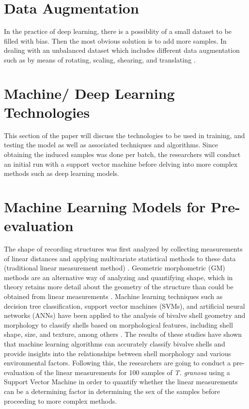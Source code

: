 \section{Data Augmentation}
In the practice of deep learning, there is a possiblity of a small dataset to be filled with bias. Then the most obvious solution is to add more samples. In dealing with an unbalanced dataset which includes different data augmentation such as by means of rotating, scaling, shearing, and translating \cite{cui2020}.

\section{Machine/ Deep Learning Technologies}
This section of the paper will discuss the technologies to be used in training, and testing the model as well as associated techniques and algorithms.  Since obtaining the induced samples was done per batch, the researchers will conduct an initial run with a support vector machine before delving into more complex methods such as deep learning models. 

\section{Machine Learning Models for Pre-evaluation }
\label{sec:ml models}

The shape of recording structures was first analyzed by collecting measurements of linear distances and applying multivariate statistical methods to these data (traditional linear measurement method) \cite{rohlf1984}. Geometric morphometric (GM) methods are an alternative way of analyzing and quantifying shape, which in theory retains more detail about the geometry of the structure than could be obtained from linear measurements \cite{adams2004}. Machine learning techniques such as decision tree classification, support vector machines (SVMs), and artificial neural networks (ANNs) have been applied to the analysis of bivalve shell geometry and morphology to classify shells based on morphological features, including shell shape, size, and texture, among others \cite{kiel2021}. The results of these studies have shown that machine learning algorithms can accurately classify bivalve shells and provide insights into the relationships between shell morphology and various environmental factors.
Following this, the researchers are going to conduct a pre-evaluation of the linear measurements for 100 samples of \textit{T. granosa} using a Support Vector Machine in order to quantify whether the linear measurements can be a determining factor in determining the sex of the samples before proceeding to more complex methods. 

